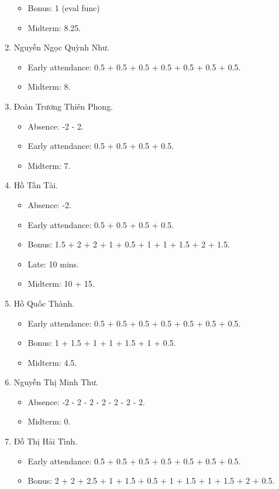 \documentclass{article}
\begin{document}
\begin{enumerate}
\begin{itemize}
		\item Bonus: 1 (eval func)
        \item Midterm: 8.25.
	\end{itemize}
	\item {\sc Nguyễn Ngọc Quỳnh Như.}
	\begin{itemize}
		\item Early attendance: 0.5 + 0.5 + 0.5 + 0.5 + 0.5 + 0.5 + 0.5.
        \item Midterm: 8.
	\end{itemize}
	\item {\sc Đoàn Trương Thiên Phong.}
	\begin{itemize}
		\item Absence: -2 - 2.
		\item Early attendance: 0.5 + 0.5 + 0.5 + 0.5.
        \item Midterm: 7.
	\end{itemize}
	\item {\sc Hồ Tấn Tài.}
	\begin{itemize}
        \item Absence: -2.
		\item Early attendance: 0.5 + 0.5 + 0.5 + 0.5.
		\item Bonus: 1.5 + 2 + 2 + 1 + 0.5 + 1 + 1 + 1.5 + 2 + 1.5.
		\item Late: 10 mins.
        \item Midterm: 10 + 15.
	\end{itemize}
	\item {\sc Hồ Quốc Thành.}
	\begin{itemize}
		\item Early attendance: 0.5 + 0.5 + 0.5 + 0.5 + 0.5 + 0.5 + 0.5.
		\item Bonus: 1 + 1.5 + 1 + 1 + 1.5 + 1 + 0.5.
        \item Midterm: 4.5.
	\end{itemize}
	\item {\sc Nguyễn Thị Minh Thư.}
	\begin{itemize}
		\item Absence: -2 - 2 - 2 - 2 - 2 - 2 - 2.
        \item Midterm: 0.
	\end{itemize}
	\item {\sc Đỗ Thị Hải Tình.}
	\begin{itemize}
		\item Early attendance: 0.5 + 0.5 + 0.5 + 0.5 + 0.5 + 0.5 + 0.5.
		\item Bonus: 2 + 2 + 2.5 + 1 + 1.5 + 0.5 + 1 + 1.5 + 1 + 1.5 + 2 + 0.5.

\end{itemize}
\end{enumerate}
\end{document}
